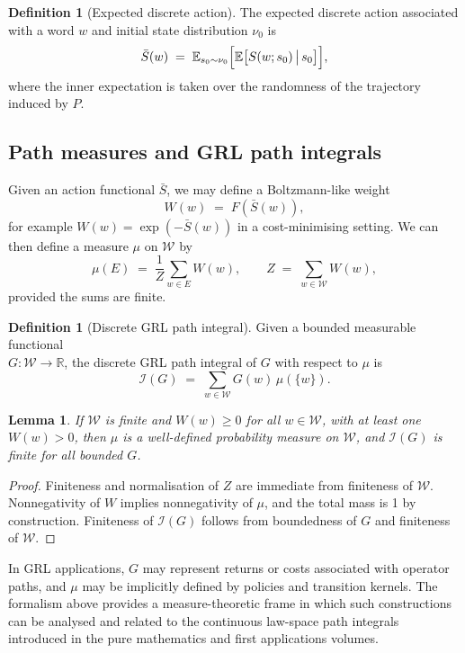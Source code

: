 \documentclass[11pt]{book}
\theoremstyle{plain}
\newtheorem{lemma}[theorem]{Lemma}
\theoremstyle{definition}
\newtheorem{definition}[theorem]{Definition}
\theoremstyle{remark}
\begin{document}
\begin{definition}[Expected discrete action]
The expected discrete action associated with a word $w$ and initial
state distribution $\nu_{0}$ is
\[
  \bar{S}(w)
  \;=\;
  \mathbb{E}_{s_{0} \sim \nu_{0}}
  \Bigl[
    \mathbb{E}\bigl[
      S(w; s_{0}) \,\big|\, s_{0}
    \bigr]
  \Bigr],
\]
where the inner expectation is taken over the randomness of the
trajectory induced by $P$.
\end{definition}

\subsection*{Path measures and GRL path integrals}

Given an action functional $\bar{S}$, we may define a Boltzmann-like
weight
\[
  W(w) \;=\; F(\bar{S}(w)),
\]
for example $W(w) = \exp(-\bar{S}(w))$ in a cost-minimising setting.
We can then define a measure $\mu$ on $\mathcal{W}$ by
\[
  \mu(E)
  \;=\;
  \frac{1}{Z}
  \sum_{w \in E} W(w),
  \qquad
  Z \;=\; \sum_{w \in \mathcal{W}} W(w),
\]
provided the sums are finite.

\begin{definition}[Discrete GRL path integral]
Given a bounded measurable functional\\
$G \colon \mathcal{W} \to \mathbb{R}$, the discrete GRL path integral
of $G$ with respect to $\mu$ is
\[
  \mathcal{I}(G)
  \;=\;
  \sum_{w \in \mathcal{W}} G(w)\, \mu(\{w\}).
\]
\end{definition}

\begin{lemma}
If $\mathcal{W}$ is finite and $W(w) \ge 0$ for all $w \in \mathcal{W}$,
with at least one $W(w) > 0$, then $\mu$ is a well-defined probability
measure on $\mathcal{W}$, and $\mathcal{I}(G)$ is finite for all
bounded $G$.
\end{lemma}

\begin{proof}
Finiteness and normalisation of $Z$ are immediate from finiteness of
$\mathcal{W}$. Nonnegativity of $W$ implies nonnegativity of $\mu$,
and the total mass is 1 by construction. Finiteness of
$\mathcal{I}(G)$ follows from boundedness of $G$ and finiteness of
$\mathcal{W}$.
\end{proof}

In GRL applications, $G$ may represent returns or costs associated
with operator paths, and $\mu$ may be implicitly defined by policies
and transition kernels. The formalism above provides a measure-theoretic
frame in which such constructions can be analysed and related to the
continuous law-space path integrals introduced in the pure mathematics
and first applications volumes.
\end{document}
